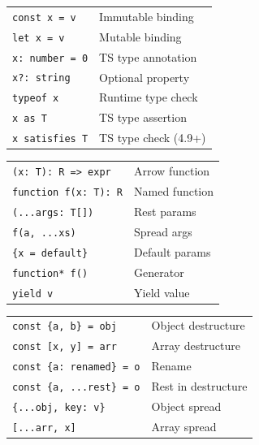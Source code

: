 \documentclass[10pt]{extarticle}
\begin{document}
\begin{multicols}{2}

\begin{tabularx}{\linewidth}{@{}l@{\enspace}Y@{}}
\texttt{const x = v}               & Immutable binding \\
\texttt{let x = v}                 & Mutable binding \\
\texttt{x: number = 0}             & TS type annotation \\
\texttt{x?: string}                & Optional property \\
\texttt{typeof x}                  & Runtime type check \\
\texttt{x as T}                    & TS type assertion \\
\texttt{x satisfies T}             & TS type check (4.9+) \\
\end{tabularx}

\begin{tabularx}{\linewidth}{@{}l@{\enspace}Y@{}}
\texttt{(x: T): R => expr}         & Arrow function \\
\texttt{function f(x: T): R}       & Named function \\
\texttt{(...args: T[])}            & Rest params \\
\texttt{f(a, ...xs)}               & Spread args \\
\texttt{\{x = default\}}           & Default params \\
\texttt{function* f()}              & Generator \\
\texttt{yield v}                    & Yield value \\
\end{tabularx}

\begin{tabularx}{\linewidth}{@{}l@{\enspace}Y@{}}
\texttt{const \{a, b\} = obj}      & Object destructure \\
\texttt{const [x, y] = arr}        & Array destructure \\
\texttt{const \{a: renamed\} = o}  & Rename \\
\texttt{const \{a, ...rest\} = o}  & Rest in destructure \\
\texttt{\{...obj, key: v\}}        & Object spread \\
\texttt{[...arr, x]}               & Array spread \\
\end{tabularx}


\end{multicols}
\end{document}

